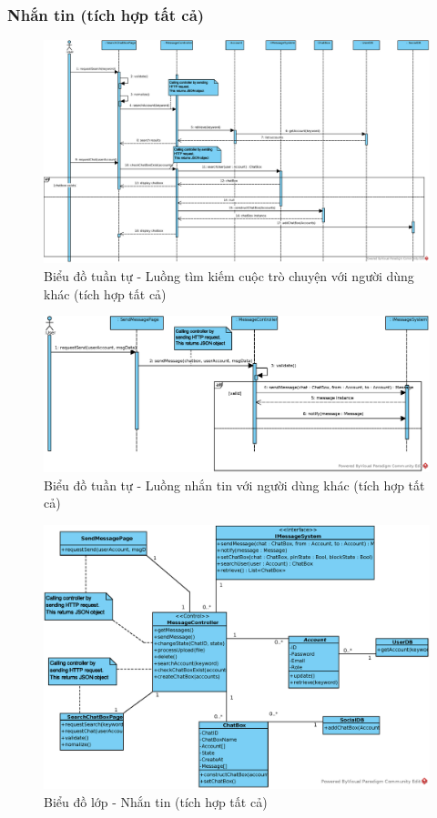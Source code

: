 \documentclass[./../main.tex]{subfiles}
\begin{document}
\subsubsection{Nhắn tin (tích hợp tất cả)}
\begin{figure}[H]
    \centering
    \includegraphics[width=\linewidth]{./images/UseCaseDesignDiagram/ucr_all_searchChatBox.eps}
    \caption{Biểu đồ tuần tự - Luồng tìm kiếm cuộc trò chuyện với người dùng khác (tích hợp tất cả)}
\end{figure}
\begin{figure}[H]
    \centering
    \includegraphics[width=\linewidth]{./images/UseCaseDesignDiagram/ucr_dis_message.eps}
    \caption{Biểu đồ tuần tự - Luồng nhắn tin với người dùng khác (tích hợp tất cả)}
\end{figure}
\begin{figure}[H]
    \centering
    \includegraphics[width=\linewidth]{./images/UseCaseDesignDiagram/ucd_all_message.eps}
    \caption{Biểu đồ lớp - Nhắn tin (tích hợp tất cả)}
\end{figure}
\end{document}
